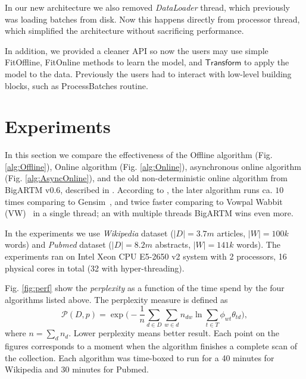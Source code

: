 \documentclass[russian,english]{llncs}
\newcommand{\kw}[1]{\textsf{#1}}
\begin{document}
In our new architecture we also removed \emph{DataLoader} thread, which previously was loading batches from disk.
Now this happens directly from processor thread, which simplified the architecture without sacrificing performance.

In addition, we provided a cleaner API so now the users may use simple \kw{FitOffline}, \kw{FitOnline} methods to learn the model,
and $\kw{Transform}$ to apply the model to the data.
Previously the users had to interact with low-level building blocks, such as \kw{ProcessBatches} routine.

\section{Experiments}
\label{sec:Experiments}

In this section we compare the effectiveness of the
\kw{Offline algorithm} (Fig. \ref{alg:Offline}),
\kw{Online algorithm} (Fig. \ref{alg:Online}),
asynchronous online algorithm (Fig. \ref{alg:AsyncOnline}),
and the old non-deterministic online algorithm from \kw{BigARTM v0.6}, described in \cite{vfardi15aist}.
According to \cite{vfardi15aist}, the later algorithm
runs ca. $10$ times comparing to Gensim~\cite{rehurek10software},
and twice faster comparing to 
Vowpal Wabbit (VW)~\cite{langford07vw}
in a single thread;
an with multiple threads BigARTM wins even more.

In the experiments we use \emph{Wikipedia} dataset ($|D| = 3.7m$ articles, $|W| = 100k$ words)
and \emph{Pubmed} dataset ($|D| = 8.2m$ abstracts, $|W| = 141k$ words).
The experiments ran on Intel Xeon CPU E5-2650 v2 system with 2 processors, 16 physical cores in total (32 with hyper-threading).


Fig. \ref{fig:perf} show the \emph{perplexity} as a function of the time spend by the four algorithms listed above.
The perplexity measure is defined as
\begin{equation}
\label{eq:perplexity}
\mathscr{P}(D, p) =
\exp \biggl( - \frac{1}{n} \sum_{d \in D} \sum_{w \in d} n_{dw} \ln \sum_{t\in T} \phi_{wt} \theta_{td} \biggr),
\end{equation}
 where $n = \sum_d n_d$. Lower perplexity means better result.
Each point on the figures corresponds to a moment when the algorithm finishes a complete scan of the collection.
Each algorithm was time-boxed to run for a 40 minutes for Wikipedia and 30 minutes for Pubmed.
\end{document}

